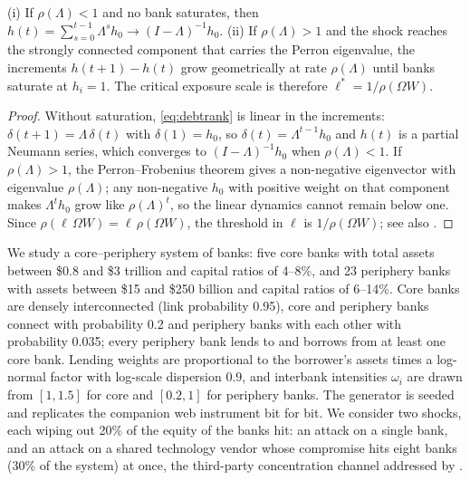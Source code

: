\begin{proposition}\label{prop:debtrank}
(i) If $\rho(\Lambda) < 1$ and no bank saturates, then $h(t) = \sum_{s=0}^{t-1}\Lambda^s h_0 \to (I-\Lambda)^{-1}h_0$. (ii) If $\rho(\Lambda) > 1$ and the shock reaches the strongly connected component that carries the Perron eigenvalue, the increments $h(t+1)-h(t)$ grow geometrically at rate $\rho(\Lambda)$ until banks saturate at $h_i = 1$. The critical exposure scale is therefore $\ell^\ast = 1/\rho(\Omega W)$.
\end{proposition}
\begin{proof}
Without saturation, \cref{eq:debtrank} is linear in the increments: $\delta(t+1) = \Lambda\,\delta(t)$ with $\delta(1) = h_0$, so $\delta(t) = \Lambda^{t-1}h_0$ and $h(t)$ is a partial Neumann series, which converges to $(I-\Lambda)^{-1}h_0$ when $\rho(\Lambda)<1$. If $\rho(\Lambda)>1$, the Perron--Frobenius theorem gives a non-negative eigenvector with eigenvalue $\rho(\Lambda)$; any non-negative $h_0$ with positive weight on that component makes $\Lambda^{t}h_0$ grow like $\rho(\Lambda)^t$, so the linear dynamics cannot remain below one. Since $\rho(\ell\,\Omega W) = \ell\,\rho(\Omega W)$, the threshold in $\ell$ is $1/\rho(\Omega W)$; see also \citet{bardoscia2017}.
\end{proof}

We study a core--periphery system of \nBanks{} banks: five core banks with total assets between \$0.8 and \$3 trillion and capital ratios of 4--8\%, and 23 periphery banks with assets between \$15 and \$250 billion and capital ratios of 6--14\%. Core banks are densely interconnected (link probability 0.95), core and periphery banks connect with probability 0.2 and periphery banks with each other with probability 0.035; every periphery bank lends to and borrows from at least one core bank. Lending weights are proportional to the borrower's assets times a log-normal factor with log-scale dispersion 0.9, and interbank intensities $\omega_i$ are drawn from $[1, 1.5]$ for core and $[0.2, 1]$ for periphery banks. The generator is seeded and replicates the companion web instrument bit for bit. We consider two shocks, each wiping out 20\% of the equity of the banks hit: an attack on a single bank, and an attack on a shared technology vendor whose compromise hits eight banks (30\% of the system) at once, the third-party concentration channel addressed by \citet{dora2022}.
